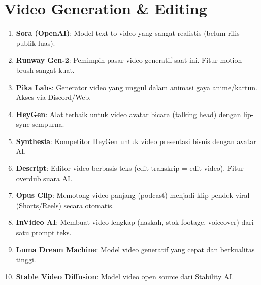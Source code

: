 \section{Video Generation \& Editing}
\begin{enumerate}
    \item \textbf{Sora (OpenAI)}: Model text-to-video yang sangat realistis (belum rilis publik luas).
    \item \textbf{Runway Gen-2}: Pemimpin pasar video generatif saat ini. Fitur motion brush sangat kuat.
    \item \textbf{Pika Labs}: Generator video yang unggul dalam animasi gaya anime/kartun. Akses via Discord/Web.
    \item \textbf{HeyGen}: Alat terbaik untuk video avatar bicara (talking head) dengan lip-sync sempurna.
    \item \textbf{Synthesia}: Kompetitor HeyGen untuk video presentasi bisnis dengan avatar AI.
    \item \textbf{Descript}: Editor video berbasis teks (edit transkrip = edit video). Fitur overdub suara AI.
    \item \textbf{Opus Clip}: Memotong video panjang (podcast) menjadi klip pendek viral (Shorts/Reels) secara otomatis.
    \item \textbf{InVideo AI}: Membuat video lengkap (naskah, stok footage, voiceover) dari satu prompt teks.
    \item \textbf{Luma Dream Machine}: Model video generatif yang cepat dan berkualitas tinggi.
    \item \textbf{Stable Video Diffusion}: Model video open source dari Stability AI.
\end{enumerate}

